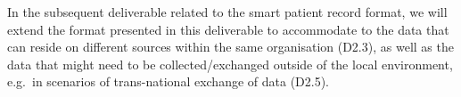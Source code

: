 In the subsequent deliverable related to the smart patient record format, we will extend the format presented in this deliverable to accommodate to the data that can reside on different sources within the same organisation (D2.3), as well as the data that might need to be collected/exchanged outside of the local environment, e.g.~in scenarios of trans-national exchange of data (D2.5).